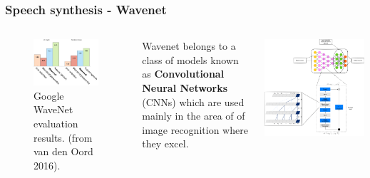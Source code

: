 \documentclass[a4paper,9pt]{beamer}
\theoremstyle{mytheoremstyle}
\begin{document}
\begin{frame}
\frametitle{Speech synthesis - Wavenet}
\begin{columns}
\begin{figure}
\begin{center}
  \includegraphics[width=\textwidth]{res/wavenet_evaluation.png}
\end{center}
	\caption{Google WaveNet evaluation results. (from van den Oord 2016).}
\end{figure}
\begin{exampleblock}{}
\scriptsize{
Wavenet belongs to a class of models known as
\textbf{Convolutional Neural Networks} (CNNs)
which are used mainly in the area of of image recognition where they excel.}
\end{exampleblock}
\includegraphics[width=\textwidth]{res/tcn.png}
\end{columns}
\end{frame}
\end{document}
